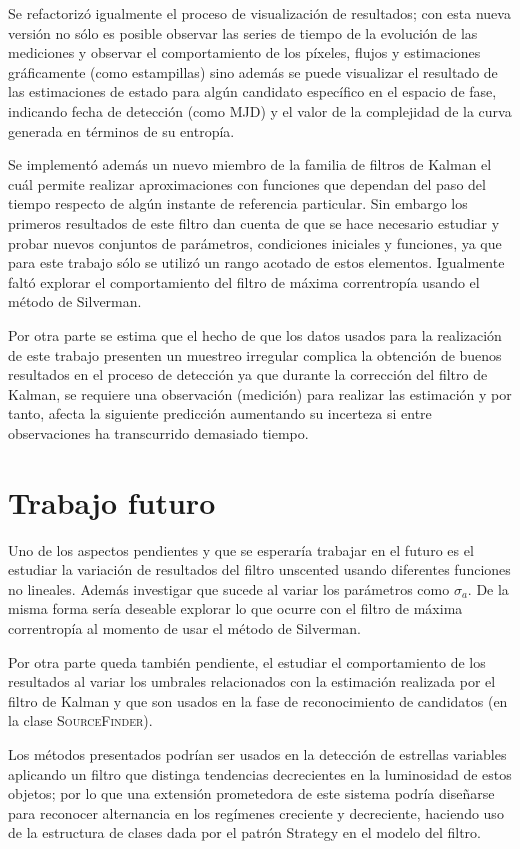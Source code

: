 Se refactoriz\'o igualmente el proceso de visualizaci\'on de resultados; con esta nueva versi\'on no s\'olo es posible observar las series de tiempo de la evoluci\'on de las mediciones y observar el comportamiento de los p\'ixeles, flujos y estimaciones gr\'aficamente (como estampillas) sino adem\'as se puede visualizar el resultado de las estimaciones de estado para alg\'un candidato espec\'ifico en el espacio de fase, indicando fecha de detecci\'on (como MJD) y el valor de la complejidad de la curva generada en t\'erminos de su entrop\'ia.
\bigskip

Se implement\'o adem\'as un nuevo miembro de la familia de filtros de Kalman el cu\'al permite realizar aproximaciones con funciones que dependan del paso del tiempo respecto de alg\'un instante de referencia particular. Sin embargo los primeros resultados de este filtro dan cuenta de que se hace necesario estudiar y probar nuevos conjuntos de par\'ametros, condiciones iniciales y funciones, ya que para este trabajo s\'olo se utiliz\'o un rango acotado de estos elementos. Igualmente falt\'o explorar el comportamiento del filtro de m\'axima correntrop\'ia usando el m\'etodo de Silverman.  
\bigskip

Por otra parte se estima que el hecho de que los datos usados para la realizaci\'on de este trabajo presenten un muestreo irregular complica la obtenci\'on de buenos resultados en el proceso de detecci\'on ya que durante la correcci\'on del filtro de Kalman, se requiere una observaci\'on (medici\'on) para realizar las estimaci\'on y por tanto, afecta la siguiente predicci\'on aumentando su incerteza si entre observaciones ha transcurrido demasiado tiempo.
\bigskip 

\section{Trabajo futuro}

Uno de los aspectos pendientes y que se esperar\'ia trabajar en el futuro es el estudiar la variaci\'on de resultados del filtro unscented usando diferentes funciones no lineales. Adem\'as investigar que sucede al variar los par\'ametros como $\sigma_a$. De la misma forma ser\'ia deseable explorar lo que ocurre con el filtro de m\'axima correntrop\'ia al momento de usar el m\'etodo de Silverman.
\bigskip

Por otra parte queda tambi\'en pendiente, el estudiar el comportamiento de los resultados al variar los umbrales relacionados con la estimaci\'on realizada por el filtro de Kalman y que son usados en la fase de reconocimiento de candidatos (en la clase \textsc{SourceFinder}).
\bigskip

Los m\'etodos presentados podr\'ian ser usados en la detecci\'on de estrellas variables aplicando un filtro que distinga tendencias decrecientes en la luminosidad de estos objetos; por lo que una extensi\'on prometedora de este sistema podr\'ia dise\~narse  para reconocer alternancia en los reg\'imenes creciente y decreciente, haciendo uso de la estructura de clases dada por el patr\'on Strategy en el modelo del filtro.
\bigskip


